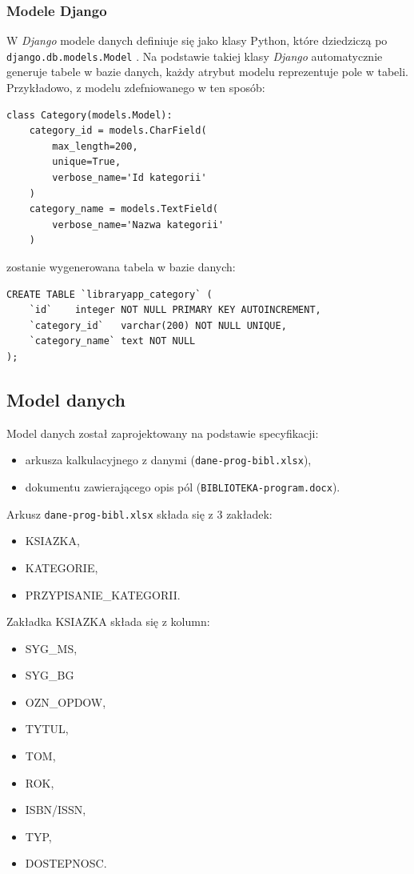 \documentclass[twoside]{projektInzynierskiMS}
\begin{document}
\subsubsection{Modele Django}
W \textit{Django} modele danych definiuje się jako klasy Python, które dziedziczą po \verb`django.db.models.Model` \cite{DjangoModel}. Na podstawie takiej klasy \textit{Django} automatycznie generuje tabele w bazie danych, każdy atrybut modelu reprezentuje pole w tabeli. Przykładowo, z modelu zdefniowanego w ten sposób:

\begin{verbatim}
class Category(models.Model):
    category_id = models.CharField(
        max_length=200,
        unique=True,
        verbose_name='Id kategorii'
    )
    category_name = models.TextField(
        verbose_name='Nazwa kategorii'
    )
\end{verbatim}
zostanie wygenerowana tabela w bazie danych:
\begin{verbatim}
CREATE TABLE `libraryapp_category` (
	`id`	integer NOT NULL PRIMARY KEY AUTOINCREMENT,
	`category_id`	varchar(200) NOT NULL UNIQUE,
	`category_name`	text NOT NULL
);
\end{verbatim}

\subsection{Model danych}

Model danych został zaprojektowany na podstawie specyfikacji:
\begin{itemize}
	\item arkusza kalkulacyjnego z danymi (\verb`dane-prog-bibl.xlsx`),
	\item dokumentu zawierającego opis pól (\verb`BIBLIOTEKA-program.docx`).
\end{itemize}

Arkusz \verb`dane-prog-bibl.xlsx` składa się z 3 zakładek:
\begin{itemize}
	\item KSIAZKA,
	\item KATEGORIE,
	\item PRZYPISANIE\_KATEGORII.
\end{itemize}

Zakładka KSIAZKA składa się z kolumn:

\begin{itemize}
	\item SYG\_MS,
	\item SYG\_BG
	\item OZN\_OPDOW,
	\item TYTUL,
	\item TOM,
	\item ROK,
	\item ISBN/ISSN,
	\item TYP,
	\item DOSTEPNOSC.
\end{itemize}
\end{document}
